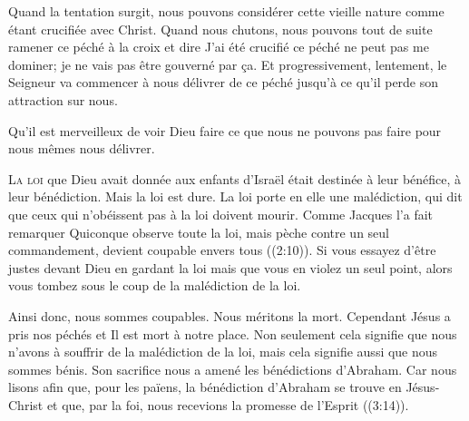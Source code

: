 
Quand la tentation surgit, nous pouvons considérer cette vieille nature
 comme étant crucifiée avec Christ. Quand nous chutons, nous pouvons
 tout de suite ramener ce péché à la croix et dire\frcolon{} 
 \Og J'ai été crucifié \ocadr ce péché ne peut pas me dominer;
 je ne vais pas être gouverné par \c{c}a. \Fg{}
 Et progressivement, lentement, le Seigneur va commencer à nous délivrer
 de ce péché jusqu'à ce qu'il perde son attraction sur nous.

Qu'il est merveilleux de voir Dieu faire ce que nous ne pouvons pas faire
 pour nous mêmes \ocadr nous délivrer.

\dvrule






\lettrine{L}{a loi} que Dieu avait donnée aux enfants d'Israël
 était destinée à leur bénéfice, à leur bénédiction.
 Mais la loi est dure. La loi porte en elle une malédiction,
 qui dit que ceux qui n'obéissent pas à la loi doivent mourir.
 Comme Jacques l'a fait remarquer\frcolon{} 
 \Og Quiconque observe toute la loi, mais pèche contre un seul commandement,
 devient coupable envers tous \Fg{} ((2:10)).
 Si vous essayez d'être justes devant Dieu en gardant la loi
 mais que vous en violez un seul point,
 alors vous tombez sous le coup de la malédiction de la loi.

Ainsi donc, nous sommes coupables. Nous méritons la mort.
 Cependant Jésus a pris nos péchés et Il est mort à notre place.
 Non seulement cela signifie que nous n'avons à souffrir de la malédiction
 de la loi, mais cela signifie aussi que nous sommes bénis.
 Son sacrifice nous a amené les bénédictions d'Abraham.
 Car nous lisons\frcolon{} 
 \Og afin que, pour les païens, la bénédiction d'Abraham se trouve
 en Jésus-Christ et que, par la foi, nous recevions la promesse
 de l'Esprit \Fg{} ((3:14)).


